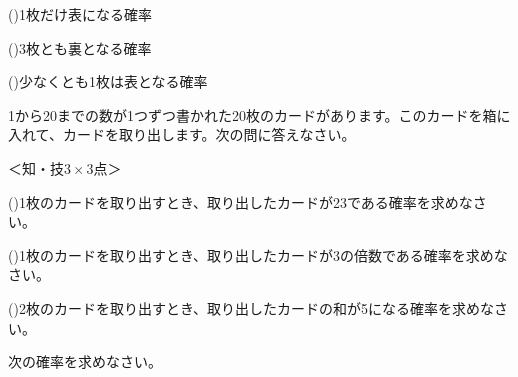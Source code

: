 \documentclass[
  12pt,a4paper,lualatex,ja=standard]{bxjsarticle}
\begin{document}
\begin{flushleft}
\vspace{10mm}

()\hspace{2.5pt}1枚だけ表になる確率

\vspace{10mm}

()\hspace{2.5pt}3枚とも裏となる確率

\vspace{10mm}

()\hspace{2.5pt}少なくとも1枚は表となる確率

\vspace{10mm}

\vfill

\setcounter{skaunta}{0}

\noindent{} \hspace{1pt}1から20までの数が1つずつ書かれた20枚のカードがあります。このカードを箱に入れて、カードを取り出します。次の問に答えなさい。

%
\begin{flushright}%
\footnotesize{＜知・技$3\times 3$点＞}%
\end{flushright}%


()\hspace{2.5pt}1枚のカードを取り出すとき、取り出したカードが23である確率を求めなさい。

\vspace{10mm}

()\hspace{2.5pt}1枚のカードを取り出すとき、取り出したカードが3の倍数である確率を求めなさい。

\vspace{10mm}

()\hspace{2.5pt}2枚のカードを取り出すとき、取り出したカードの和が5になる確率を求めなさい。

\vspace{10mm}

\vfill

\setcounter{skaunta}{0}

\noindent{} \hspace{1pt}次の確率を求めなさい。


\end{flushleft}
\end{document}
